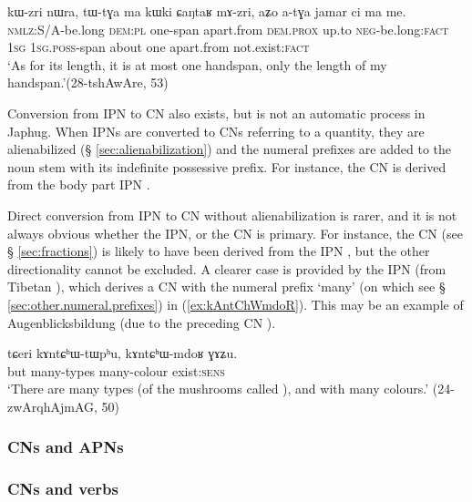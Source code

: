 \begin{exe}
\ex \label{ex:aZo.atGa}
 \gll kɯ-zri nɯra, tɯ-tɣa ma kɯki ɕaŋtaʁ mɤ-zri, aʑo a-tɣa jamar ci ma me. \\
 \textsc{nmlz}:S/A-be.long \textsc{dem}:\textsc{pl} one-span apart.from \textsc{dem}.\textsc{prox} up.to \textsc{neg}-be.long:\textsc{fact} \textsc{1sg} \textsc{1sg}.\textsc{poss}-span about one apart.from not.exist:\textsc{fact} \\
 \glt `As for its length, it is at most one handspan, only the length of my handspan.'(28-tshAwAre, 53)
\end{exe}
Conversion from IPN to CN also exists, but is not an automatic process in Japhug. When IPNs are converted to CNs referring to a quantity, they are alienabilized (§ \ref{sec:alienabilization}) and the numeral prefixes are added to the noun stem with its indefinite possessive prefix. For instance, the CN  is derived from the body part IPN . 

Direct conversion from IPN to CN without alienabilization is rarer, and it is not always obvious whether the IPN, or the CN is primary. For instance, the CN  (see § \ref{sec:fractions}) is likely to have been derived from the IPN , but the other directionality cannot be excluded. A clearer case is provided by the IPN   (from Tibetan ), which derives a CN with the numeral prefix  `many' (on which see § \ref{sec:other.numeral.prefixes}) in (\ref{ex:kAntChWmdoR}). This may be an example of Augenblicksbildung (due to the preceding CN ).

\begin{exe}
\ex \label{ex:kAntChWmdoR}
 \gll  tɕeri kɤntɕʰɯ-tɯpʰu, kɤntɕʰɯ-mdoʁ ɣɤʑu. \\
 but many-types many-colour exist:\textsc{sens} \\
\glt  `There are many types (of the mushrooms called ), and with many colours.' (24-zwArqhAjmAG, 50)
\end{exe}

\subsubsection{CNs and APNs}   \label{sec:CN.APN}
\subsubsection{CNs and verbs}   \label{sec:CN.verbs}
